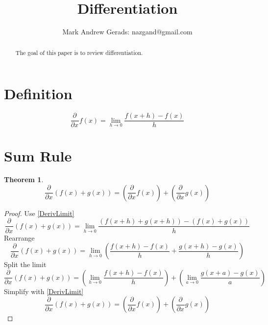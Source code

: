\documentclass[]{article}
\author{Mark Andrew Gerads: nazgand@gmail.com}
\title{Differentiation}
\newcommand{\pqty}[1]{{\left(#1\right)}}
\newcommand{\pdiff}[2]{\frac{\partial^{#2}}{\partial #1^{#2}}}
\newtheorem{theorem}{Theorem}[section]
\numberwithin{equation}{section}
\begin{document}
	
	\maketitle
	
	\begin{abstract}
		The goal of this paper is to review differentiation.
	\end{abstract}
	
	\section{Definition}
	\begin{equation}
	\label{DerivLimit}
	\pdiff{x}{}f\pqty{x}=\lim\limits_{h\to 0}\frac{f\pqty{x+h}-f\pqty{x}}{h}
	\end{equation}
	
	\section{Sum Rule}
	\begin{theorem}
		\begin{equation}
		\label{DiffSum}
		\pdiff{x}{}\pqty{f\pqty{x}+g\pqty{x}}=
		\pqty{\pdiff{x}{}f\pqty{x}}+
		\pqty{\pdiff{x}{}g\pqty{x}}
		\end{equation}
	\end{theorem}
	\begin{proof}
		Use \eqref{DerivLimit}
		\begin{equation}
		\pdiff{x}{}\pqty{f\pqty{x}+g\pqty{x}}
		=\lim\limits_{h\to 0}
		\frac{\pqty{f\pqty{x+h}+g\pqty{x+h}}-\pqty{f\pqty{x}+g\pqty{x}}}{h}
		\end{equation}
		Rearrange
		\begin{equation}
		\pdiff{x}{}\pqty{f\pqty{x}+g\pqty{x}}
		=\lim\limits_{h\to 0}
		\pqty{\frac{{f\pqty{x+h}-f\pqty{x}}}{h}
		+
		\frac{{g\pqty{x+h}-g\pqty{x}}}{h}}
		\end{equation}
		Split the limit
		\begin{equation}
		\pdiff{x}{}\pqty{f\pqty{x}+g\pqty{x}}
		=\pqty{\lim\limits_{h\to 0}
		\frac{{f\pqty{x+h}-f\pqty{x}}}{h}}
			+ \pqty{\lim\limits_{a\to 0}
			\frac{{g\pqty{x+a}-g\pqty{x}}}{a}}
		\end{equation}
		Simplify with \eqref{DerivLimit}
		\begin{equation}
		\pdiff{x}{}\pqty{f\pqty{x}+g\pqty{x}}=
		\pqty{\pdiff{x}{}f\pqty{x}}+
		\pqty{\pdiff{x}{}g\pqty{x}}
		\end{equation}
	\end{proof}
\end{document}
